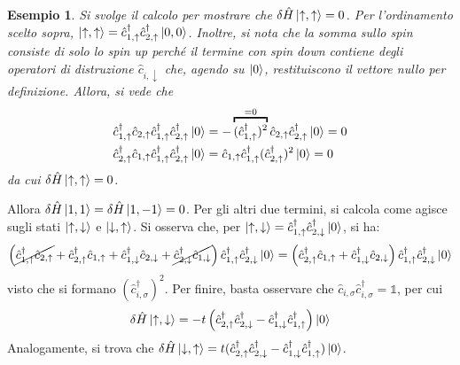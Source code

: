 \documentclass[11pt, a4paper]{scrartcl}
\theoremstyle{style}
\newtheorem{esempio}{Esempio}[section]
\theoremstyle{style1}
\numberwithin{equation}{subsection}
\begin{document}
\begin{esempio}
Si svolge il calcolo per mostrare che $\delta \hat{H} \ket{\uparrow,\uparrow} =0 $. 
Per l'ordinamento scelto sopra, $\ket{\uparrow,\uparrow} = \hat{c}^\dagger _{1,\uparrow} \hat{c}^\dagger _{2,\uparrow}\ket{0,0}  $.
Inoltre, si nota che la somma sullo spin consiste di solo lo spin up perch\'e il termine con spin down contiene degli operatori di distruzione $\hat{c}_{i,\downarrow} $ che, agendo su $\ket{0} $, restituiscono il vettore nullo per definizione.
Allora, si vede che
\[
	\begin{split}
	&\hat{c}^\dagger _{1,\uparrow} \hat{c}_{2,\uparrow} \hat{c}^\dagger _{1,\uparrow} \hat{c}^\dagger _{2,\uparrow} \ket{0} =- \overbracket{(\hat{c}^\dagger _{1,\uparrow} )^2}^{=0} \hat{c}_{2,\uparrow} \hat{c}^\dagger _{2,\uparrow} \ket{0} = 0 \\
	&\hat{c}^\dagger _{2,\uparrow} \hat{c}_{1,\uparrow} \hat{c}^\dagger _{1,\uparrow} \hat{c}^\dagger _{2,\uparrow} \ket{0} = \hat{c}_{1,\uparrow} \hat{c}^\dagger _{1,\uparrow} (\hat{c}^\dagger _{2,\uparrow} )^2 \ket{0}  = 0
	\end{split}
\] 
da cui $\delta \hat{H} \ket{\uparrow,\uparrow} =0$.
\end{esempio}
\noindent Allora $\delta \hat{H} \ket{1,1} = \delta \hat{H} \ket{1,-1} =0$.
Per gli altri due termini, si calcola come agisce sugli stati $\ket{\uparrow,\downarrow} $ e $\ket{\downarrow,\uparrow} $.
Si osserva che, per $\ket{\uparrow,\downarrow} = \hat{c}^\dagger _{1,\uparrow} \hat{c}^\dagger _{2,\downarrow} \ket{0} $, si ha:
\[
	\left(\cancel{\hat{c}^\dagger _{1,\uparrow} \hat{c}_{2,\uparrow}} + \hat{c}^\dagger _{2,\uparrow}\hat{c}_{1,\uparrow} +\hat{c}^\dagger _{1,\downarrow} \hat{c}_{2,\downarrow} + \cancel{\hat{c}^\dagger _{2,\downarrow} \hat{c}_{1,\downarrow}}  \right) \hat{c}^\dagger _{1,\uparrow} \hat{c}^\dagger _{2,\downarrow} \ket{0} = \left(\hat{c}^\dagger _{2,\uparrow}\hat{c}_{1,\uparrow} +\hat{c}^\dagger _{1,\downarrow} \hat{c}_{2,\downarrow} \right) \hat{c}^\dagger _{1,\uparrow} \hat{c}^\dagger _{2,\downarrow} \ket{0}
\] 
visto che si formano $(\hat{c}^\dagger _{i,\sigma } )^2$.
Per finire, basta osservare che $\hat{c}_{i,\sigma } \hat{c}^\dagger _{i,\sigma } = \mathds{1}$, per cui 
\[
\delta \hat{H} \ket{\uparrow,\downarrow} = - t \left(\hat{c}^\dagger _{2,\uparrow} \hat{c}^\dagger _{2,\downarrow}  - \hat{c}^\dagger _{1,\downarrow} \hat{c}^\dagger _{1,\uparrow} \right) \ket{0} 
\] 
Analogamente, si trova che $\delta \hat{H} \ket{\downarrow,\uparrow}=t(\hat{c}^\dagger _{2,\uparrow} \hat{c}^\dagger _{2,\downarrow}  - \hat{c}^\dagger _{1,\downarrow} \hat{c}^\dagger _{1,\uparrow} ) \ket{0}  $.
\end{document}
